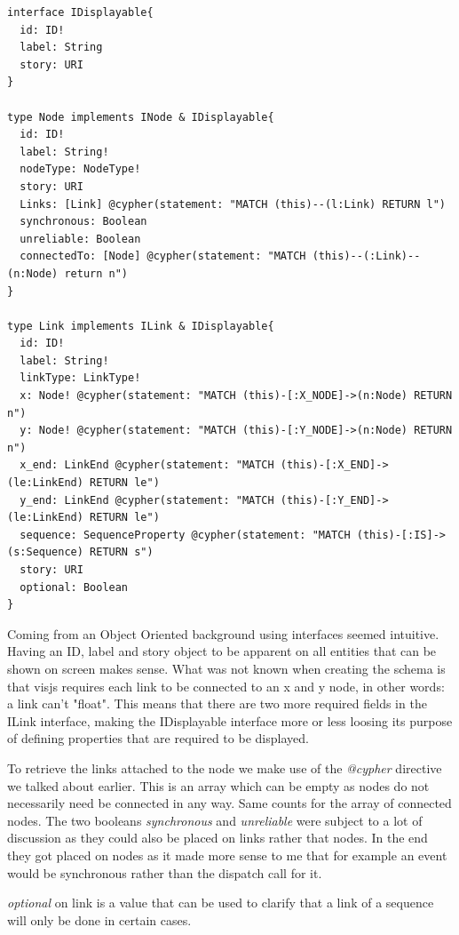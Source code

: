 \begin{lstlisting}[caption={Usage of Interfaces in GraphQL}]
interface IDisplayable{
  id: ID!
  label: String
  story: URI
}

type Node implements INode & IDisplayable{
  id: ID!
  label: String!
  nodeType: NodeType!
  story: URI
  Links: [Link] @cypher(statement: "MATCH (this)--(l:Link) RETURN l")
  synchronous: Boolean
  unreliable: Boolean
  connectedTo: [Node] @cypher(statement: "MATCH (this)--(:Link)--(n:Node) return n")
}
  
type Link implements ILink & IDisplayable{
  id: ID!
  label: String!
  linkType: LinkType!
  x: Node! @cypher(statement: "MATCH (this)-[:X_NODE]->(n:Node) RETURN n")
  y: Node! @cypher(statement: "MATCH (this)-[:Y_NODE]->(n:Node) RETURN n")
  x_end: LinkEnd @cypher(statement: "MATCH (this)-[:X_END]->(le:LinkEnd) RETURN le")
  y_end: LinkEnd @cypher(statement: "MATCH (this)-[:Y_END]->(le:LinkEnd) RETURN le")
  sequence: SequenceProperty @cypher(statement: "MATCH (this)-[:IS]->(s:Sequence) RETURN s")
  story: URI
  optional: Boolean
}

\end{lstlisting}
Coming from an Object Oriented background using interfaces seemed intuitive. Having an ID, label and story object to be apparent on all entities that can be shown on screen makes sense. What was not known when creating the schema is that visjs requires each link to be connected to an x and y node, in other words: a link can't "float". This means that there are two more required fields in the ILink interface, making the IDisplayable interface more or less loosing its purpose of defining properties that are required to be displayed.

To retrieve the links attached to the node we make use of the \emph{@cypher} directive we talked about earlier. This is an array which can be empty as nodes do not necessarily need be connected in any way. Same counts for the array of connected nodes. The two booleans \emph{synchronous} and \emph{unreliable} were subject to a lot of discussion as they could also be placed on links rather that nodes. In the end they got placed on nodes as it made more sense to me that for example an event would be synchronous rather than the dispatch call for it.

\emph{optional} on link is a value that can be used to clarify that a link of a sequence will only be done in certain cases.


